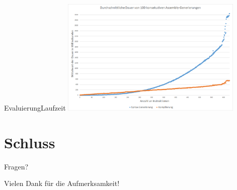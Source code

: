 \documentclass[t,aspectratio=169,divpsnames]{beamer}
\begin{document}
\begin{frame}{Evaluierung}{Laufzeit}
	\center
	\includegraphics[width=0.65\textwidth]{img/AverageTimeDiagram2.png}
\end{frame}

\section*{Schluss}
\begin{frame}
	\begin{center}
		\Huge{Fragen?}
	\end{center}
\end{frame}

\begin{frame}
	\begin{center}
		\Huge{Vielen Dank für die Aufmerksamkeit!}
	\end{center}
\end{frame}
\end{document}
